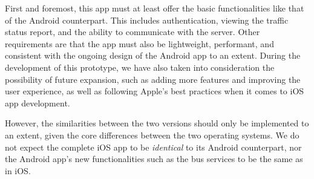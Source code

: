 First and foremost, this app must at least offer the basic functionalities like that of the Android counterpart. This includes authentication, viewing the traffic status report, and the ability to communicate with the server. Other requirements are that the app must also be lightweight, performant, and consistent with the ongoing design of the Android app to an extent. During the development of this prototype, we have also taken into consideration the possibility of future expansion, such as adding more features and improving the user experience, as well as following Apple's best practices when it comes to iOS app development.

However, the similarities between the two versions should only be implemented to an extent, given the core differences between the two operating systems. We do not expect the complete iOS app to be \textit{identical} to its Android counterpart, nor the Android app's new functionalities such as the bus services to be the same as in iOS. 

